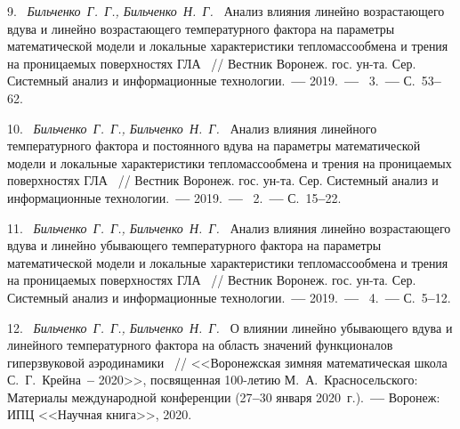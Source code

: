 9.~%
\textit%
{Бильченко~Г.~Г.,
 Бильченко~Н.~Г.~}
{%
  {Анализ  влияния
линейно  возрастающего
вдува
и
линейно  возрастающего
температурного  фактора
на  параметры  математической  модели  и
локальные  характеристики  тепломассообмена
и  трения
на  проницаемых  поверхностях  ГЛА}%
~/$\!$/
  Вестник  Воронеж.  гос.  ун-та.
  Сер.  Системный  анализ
  и  информационные  технологии.~{\textbf{---}}
  2019.~{\textbf{---}}
  \No~3.~{\textbf{---}}
  С.~53{\textbf{--}}62.%
  }



10.~%
\textit%
{Бильченко~Г.~Г.,
 Бильченко~Н.~Г.~}
{%
  {Ана\-лиз  влияния
линейного  температурного  фактора
и  постоянного  вдува
на  параметры  математической  модели  и
локальные  характеристики  тепломассообмена
и  трения
на  проницаемых  поверхностях  ГЛА}%
~/$\!$/
  Вестник  Воронеж.  гос.  ун-та.
  Сер.  Системный  анализ
  и  информационные  технологии.~{\textbf{---}}
  2019.~{\textbf{---}}
  \No~2.~{\textbf{---}}
  С.~15{\textbf{--}}22.%
  }



11.~%
\textit%
{Бильченко~Г.~Г.,
 Бильченко~Н.~Г.~}
{%
  {Анализ  влияния
линейно  возрастающего
вдува
и
линейно  убывающего
температурного  фактора
на  параметры  математической  модели  и
локальные  характеристики  тепломассообмена
и  трения
на  проницаемых  поверхностях  ГЛА}%
~/$\!$/
  Вестник  Воронеж.  гос.  ун-та.
  Сер.  Системный  анализ
  и  информационные  технологии.~{\textbf{---}}
  2019.~{\textbf{---}}
  \No~4.~{\textbf{---}}
  С.~5{\textbf{--}}12.%
  }



12.~%
\textit%
{Бильченко~Г.~Г.,
 Бильченко~Н.~Г.~}
{%
  {О  влиянии  линейно  убывающего  вдува
и  линейного  температурного  фактора
на  область  значений  функционалов
гиперзвуковой  аэродинамики}%
~/$\!$/
  <<Воронежская  зимняя  математическая  школа
  С.~Г.~Крейна~{\textbf{--}}  2020>>,
  посвященная  100-летию
  М.~А.~Красносельского:
  Материалы  международной  конференции
  (27{\textbf{--}}30
  января  2020~г.).~{\textbf{---}}
  Воронеж:  ИПЦ  <<Научная  книга>>,
  2020.%
  }



